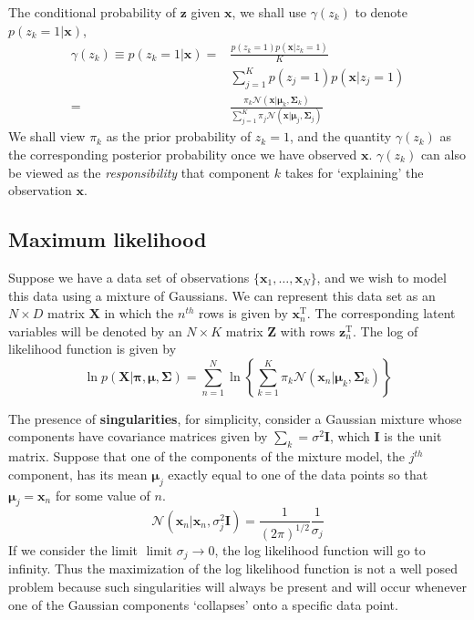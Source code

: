 \documentclass[5p,sort&compress]{elsarticle}
\begin{document}
The conditional probability of $\mathbf{z}$ given $\mathbf{x}$, we shall use $\gamma(z_k)$ to denote $p(z_k = 1 | \mathbf{x})$,
\begin{equation}
\begin{aligned} \gamma\left(z_{k}\right) \equiv p\left(z_{k}=1 | \mathbf{x}\right)=& \frac{p\left(z_{k}=1\right) p\left(\mathbf{x} | z_{k}=1\right)}{K} \\ & \sum_{j=1}^{K} p\left(z_{j}=1\right) p\left(\mathbf{x} | z_{j}=1\right) \\=& \frac{\pi_{k} \mathcal{N}\left(\mathbf{x} | \boldsymbol{\mu}_{k}, \mathbf{\Sigma}_{k}\right)}{\sum_{j=1}^{K} \pi_{j} \mathcal{N}\left(\mathbf{x} | \boldsymbol{\mu}_{j}, \mathbf{\Sigma}_{j}\right)} \end{aligned}
\end{equation}
We shall view $\pi_k$ as the prior probability of $z_k = 1$, and the quantity $\gamma (z_k)$ as the corresponding posterior probability once we have observed $\mathbf{x}$. $\gamma (z_k)$ can also be viewed as the \textit{responsibility} that component $k$ takes for `explaining' the observation $\mathbf{x}$.


\subsection{Maximum likelihood}

Suppose we have a data set of observations $\{\mathbf{x}_1, \ldots, \mathbf{x}_N\}$, and we wish to model this data using a mixture of Gaussians. We can represent this data set as an $N \times D$ matrix $\mathbf{X}$ in which the $n^{th}$ rows is given by $\mathbf{x}_n^{\mathrm{T}}$. The corresponding latent variables will be denoted by an $N \times K$ matrix $\mathbf{Z}$ with rows $\mathbf{z}_n^{\mathrm{T}}$. The log of likelihood function is given by
\begin{equation}
\ln p(\mathbf{X} | \boldsymbol{\pi}, \boldsymbol{\mu}, \mathbf{\Sigma})=\sum_{n=1}^{N} \ln \left\{\sum_{k=1}^{K} \pi_{k} \mathcal{N}\left(\mathbf{x}_{n} | \boldsymbol{\mu}_{k}, \mathbf{\Sigma}_{k}\right)\right\}
\end{equation}

The presence of \textbf{singularities}, for simplicity, consider a Gaussian mixture whose components have covariance matrices given by $\sum_k = \sigma^2 \mathbf{I}$, which $\mathbf{I}$ is the unit matrix. Suppose that one of the components of the mixture model, the $j^{th}$ component, has its mean $\boldsymbol{\mu}_j$ exactly equal to one of the data points so that $\boldsymbol{\mu}_j = \mathbf{x}_n$ for some value of $n$.
\begin{equation}
\mathcal{N}\left(\mathbf{x}_{n} | \mathbf{x}_{n}, \sigma_{j}^{2} \mathbf{I}\right)=\frac{1}{(2 \pi)^{1 / 2}} \frac{1}{\sigma_{j}}
\end{equation}
If we consider the limit $\text { limit } \sigma_{j} \rightarrow 0$, the log likelihood function will go to infinity. Thus the maximization of the log likelihood function is not a well posed problem because such singularities will always be present and will occur whenever one of the Gaussian components `collapses' onto a specific data point.
\end{document}

